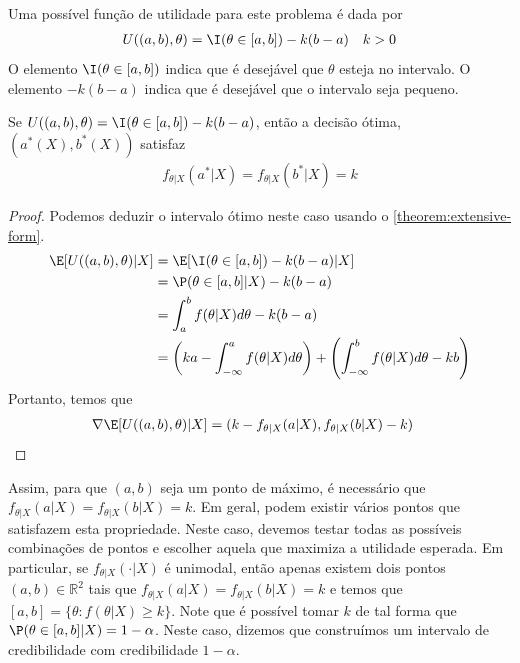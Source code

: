 Uma possível função de utilidade para 
este problema é dada por
\begin{align*}
 U((a,b),\theta)
 &= \I(\theta \in [a,b]) -k(b-a)
 & k > 0
\end{align*}
O elemento $\I(\theta \in [a,b])$ indica que 
é desejável que $\theta$ esteja no intervalo.
O elemento $-k(b-a)$ indica que 
é desejável que o intervalo seja pequeno.
\begin{theorem}
 \label{thm:credible_interval_1}
 Se $U((a,b),\theta) = \I(\theta \in [a,b]) -k(b-a)$,
 então a decisão ótima, $(a^{*}(X),b^{*}(X))$ satisfaz
 \begin{align*}
  f_{\theta|X}(a^{*}|X)
  =f_{\theta|X}(b^{*}|X) = k
 \end{align*}
\end{theorem}
\begin{proof}
 Podemos deduzir o intervalo ótimo neste caso 
 usando o \cref{theorem:extensive-form}. 
 \begin{align*}
  \E[U((a,b),\theta)|X]	
  &= \E[\I(\theta \in [a,b]) -k(b-a)|X] \\
  &= \P(\theta \in [a,b]|X) -k(b-a) \\
  &= \int_{a}^{b}{f(\theta|X)d\theta} -k(b-a) \\
  &= \left(ka-\int_{-\infty}^{a}{f(\theta|X)d\theta}\right) 
  +\left(\int_{-\infty}^{b}{f(\theta|X)d\theta}-kb\right)
 \end{align*}
 Portanto, temos que
 \begin{align*}
  \nabla \E[U((a,b),\theta)|X]
  &= (k-f_{\theta|X}(a|X), f_{\theta|X}(b|X)-k)
 \end{align*}
\end{proof}
Assim, para que $(a,b)$ seja um ponto de máximo,
é necessário que
$f_{\theta|X}(a|X) = f_{\theta|X}(b|X) = k$.
Em geral, podem existir vários pontos que 
satisfazem esta propriedade.
Neste caso, devemos testar 
todas as possíveis combinações de pontos
e escolher aquela que maximiza a utilidade esperada.
Em particular, se $f_{\theta|X}(\cdot|X)$ é unimodal, 
então apenas existem dois pontos 
$(a,b) \in \mathbb{R}^{2}$ tais que 
$f_{\theta|X}(a|X) = f_{\theta|X}(b|X) = k$ e temos que
$[a,b] = \{\theta: f(\theta|X) \geq k\}$.
Note que é possível tomar $k$ de tal forma que 
$\P(\theta \in [a,b]|X) = 1-\alpha$.
Neste caso, dizemos que construímos um 
intervalo de credibilidade com 
credibilidade $1-\alpha$.

